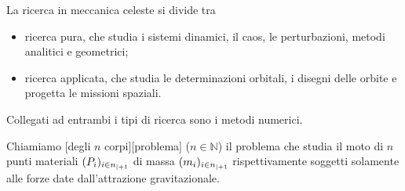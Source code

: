 \par La ricerca in meccanica celeste si divide tra
\begin{itemize}
	\item ricerca pura, che studia i sistemi dinamici, il caos, le perturbazioni, metodi analitici e geometrici;
	\item ricerca applicata, che studia le determinazioni orbitali, i disegni delle orbite e progetta le missioni spaziali.
\end{itemize}
\par Collegati ad entrambi i tipi di ricerca sono i metodi numerici.
\begin{Definition}
	Chiamiamo [degli $n$ corpi][problema] ($n \in \mathbb{N}$) il problema che studia il moto di $n$ punti materiali $(P_i)_{i \in {n}_{|+ 1}}$ di massa $(m_i)_{i \in {n}_{|+ 1}}$ rispettivamente soggetti solamente alle forze date dall'attrazione gravitazionale.
\end{Definition}
